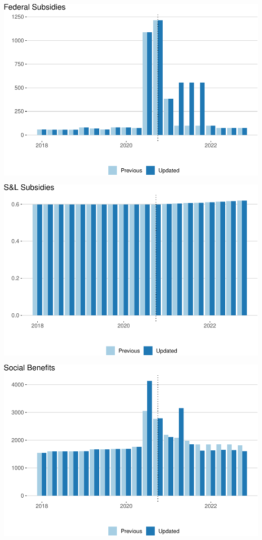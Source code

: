 \documentclass[
]{article}
\begin{document}
\begin{center}\includegraphics{update-changes-levels_files/figure-latex/subsidies_federal-1} \end{center}

\begin{center}\includegraphics{update-changes-levels_files/figure-latex/subsidies_state-1} \end{center}

\begin{center}\includegraphics{update-changes-levels_files/figure-latex/social-benefits-1} \end{center}
\end{document}
